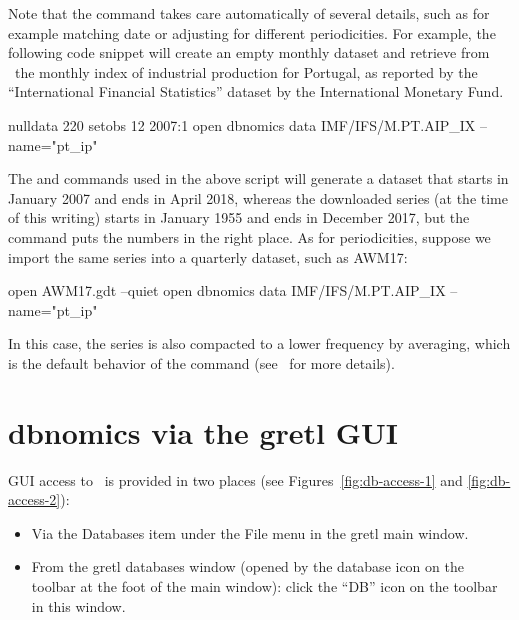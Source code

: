 \documentclass{article}
\begin{document}
Note that the  command takes care automatically of several
details, such as for example matching date or adjusting for different
periodicities. For example, the following code snippet will create an
empty monthly dataset and retrieve from \DB\ the monthly index of
industrial production for Portugal, as reported by the ``International
Financial Statistics'' dataset by the International Monetary Fund.
\begin{code}
  nulldata 220
  setobs 12 2007:1
  open dbnomics
  data IMF/IFS/M.PT.AIP_IX --name="pt_ip"
\end{code}
The  and  commands used in the above script
will generate a dataset that starts in January 2007 and ends in April
2018, whereas the downloaded series (at the time of this writing)
starts in January 1955 and ends in December 2017, but the 
command puts the numbers in the right place. As for periodicities,
suppose we import the same series into a quarterly dataset, such as
AWM17:
\begin{code}
  open AWM17.gdt --quiet
  open dbnomics
  data IMF/IFS/M.PT.AIP_IX --name="pt_ip"
\end{code}
In this case, the series is also compacted to a lower frequency by
averaging, which is the default behavior of the 
command (see \GUG\ for more details).

\section{dbnomics via the gretl GUI}
\label{sec:dbn-gui}

GUI access to \DB\ is provided in two places (see
Figures~\ref{fig:db-access-1} and \ref{fig:db-access-2}):
\begin{itemize}
\item Via the \textsf{Databases} item under the \textsf{File} menu in
  the gretl main window.
\item From the gretl databases window (opened by the database icon on
  the toolbar at the foot of the main window): click the ``DB'' icon
  on the toolbar in this window.
\end{itemize}
\end{document}
